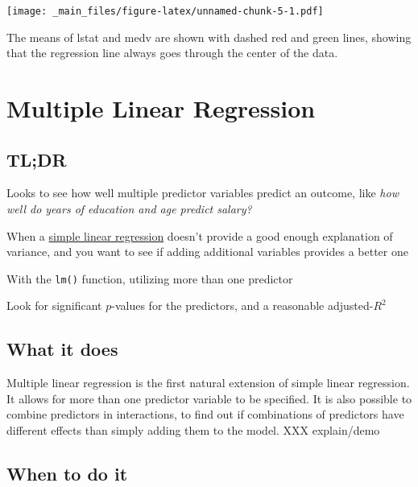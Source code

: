\documentclass[
]{book}
\providecommand{\tightlist}{%
  \setlength{\itemsep}{0pt}\setlength{\parskip}{0pt}}
\begin{document}
\texttt{[image: \_main\_files/figure-latex/unnamed-chunk-5-1.pdf]}

The means of lstat and medv are shown with dashed red and green lines, showing that the regression line always goes through the center of the data.

\hypertarget{multiple-linear-regression}{%
\chapter{Multiple Linear Regression}\label{multiple-linear-regression}}

\hypertarget{tldr-1}{%
\section{TL;DR}\label{tldr-1}}

\begin{description}
\tightlist
\item[What it does]
Looks to see how well multiple predictor variables predict an outcome, like \emph{how well do years of education and age predict salary?}
\item[When to do it]
When a \protect\hyperlink{simple-linear-regression}{simple linear regression} doesn't provide a good enough explanation of variance, and you want to see if adding additional variables provides a better one
\item[How to do it]
With the \texttt{lm()} function, utilizing more than one predictor
\item[How to assess it]
Look for significant \(p\)-values for the predictors, and a reasonable adjusted-\(R^2\)
\end{description}

\hypertarget{what-it-does-1}{%
\section{What it does}\label{what-it-does-1}}

Multiple linear regression is the first natural extension of simple linear regression. It allows for more than one predictor variable to be specified. It is also possible to combine predictors in interactions, to find out if combinations of predictors have different effects than simply adding them to the model. XXX explain/demo

\hypertarget{when-to-do-it-1}{%
\section{When to do it}\label{when-to-do-it-1}}
\end{document}
